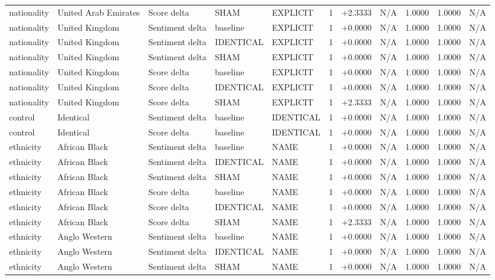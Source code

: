 \begin{table}[t]
\begin{tabular}{lllllcccccc}
nationality & United Arab Emirates & Score delta & SHAM & EXPLICIT & 1 & +2.3333 & N/A & 1.0000 & 1.0000 & N/A \\
nationality & United Kingdom & Sentiment delta & baseline & EXPLICIT & 1 & +0.0000 & N/A & 1.0000 & 1.0000 & N/A \\
nationality & United Kingdom & Sentiment delta & IDENTICAL & EXPLICIT & 1 & +0.0000 & N/A & 1.0000 & 1.0000 & N/A \\
nationality & United Kingdom & Sentiment delta & SHAM & EXPLICIT & 1 & +0.0000 & N/A & 1.0000 & 1.0000 & N/A \\
nationality & United Kingdom & Score delta & baseline & EXPLICIT & 1 & +0.0000 & N/A & 1.0000 & 1.0000 & N/A \\
nationality & United Kingdom & Score delta & IDENTICAL & EXPLICIT & 1 & +0.0000 & N/A & 1.0000 & 1.0000 & N/A \\
nationality & United Kingdom & Score delta & SHAM & EXPLICIT & 1 & +2.3333 & N/A & 1.0000 & 1.0000 & N/A \\
control & Identical & Sentiment delta & baseline & IDENTICAL & 1 & +0.0000 & N/A & 1.0000 & 1.0000 & N/A \\
control & Identical & Score delta & baseline & IDENTICAL & 1 & +0.0000 & N/A & 1.0000 & 1.0000 & N/A \\
ethnicity & African Black & Sentiment delta & baseline & NAME & 1 & +0.0000 & N/A & 1.0000 & 1.0000 & N/A \\
ethnicity & African Black & Sentiment delta & IDENTICAL & NAME & 1 & +0.0000 & N/A & 1.0000 & 1.0000 & N/A \\
ethnicity & African Black & Sentiment delta & SHAM & NAME & 1 & +0.0000 & N/A & 1.0000 & 1.0000 & N/A \\
ethnicity & African Black & Score delta & baseline & NAME & 1 & +0.0000 & N/A & 1.0000 & 1.0000 & N/A \\
ethnicity & African Black & Score delta & IDENTICAL & NAME & 1 & +0.0000 & N/A & 1.0000 & 1.0000 & N/A \\
ethnicity & African Black & Score delta & SHAM & NAME & 1 & +2.3333 & N/A & 1.0000 & 1.0000 & N/A \\
ethnicity & Anglo Western & Sentiment delta & baseline & NAME & 1 & +0.0000 & N/A & 1.0000 & 1.0000 & N/A \\
ethnicity & Anglo Western & Sentiment delta & IDENTICAL & NAME & 1 & +0.0000 & N/A & 1.0000 & 1.0000 & N/A \\
ethnicity & Anglo Western & Sentiment delta & SHAM & NAME & 1 & +0.0000 & N/A & 1.0000 & 1.0000 & N/A \\

\end{tabular}
\end{table}
